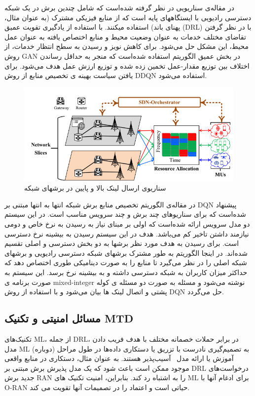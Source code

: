 در مقاله‌ی
 \cite{gan1, gan2}
سناریویی در نظر گرفته شده‌است که شامل چندین برش در یک شبکه دسترسی رادیویی با ایستگاههای پایه است که از منابع فیزیکی مشترک (به عنوان مثال، پهنای باند) استفاده میکنند. 
با استفاده از یادگیری تقویت عمیق (DRL) با در نظر گرفتن تقاضای مختلف خدمات به عنوان وضعیت محیط و منابع اختصاص یافته به عنوان عمل محیط، این مشکل حل می‌شود.
برای کاهش نویز و رسیدن به سطح انتظار خدمات، از روش GAN در بخش عمیق الگوریتم استفاده شده‌است که منجر به حداقل رساندن اختلاف بین توزیع مقدار-عمل تخمین زده شده و توزیع ارزش عمل هدف
می‌شود.
برای یافتن سیاست بهینه ی تخصیص منابع از روش
DDQN 
 استفاده می‌شود.
\begin{figure}
  \centering
    \includegraphics[scale=0.7]{./fig/gan}
  \caption{سناریوی ارسال لینک بالا و پایین در برشهای شبکه }
  \label{fig:gan}
\end{figure} 
 
در مقاله‌ی
\cite{li2020end} 
الگوریتم تخصیص منابع برش شبکه انتها به انتها مبتنی بر 
DQN 
 پیشنهاد شده‌است که برای سناریوهای چند برش و چند سرویس مناسب است.
 در این سیستم دو مدل سرویس ارائه شده‌است که اولی بر مبنای نیاز به رسیدن به نرخ خاص و دومی نیازمند داشتن تاخیر کم می‌باشد.
هدف در این سیستم رسیدن به بیشینه نرخ دسترسی است.
برای رسیدن به هدف مورد نظر برشها به دو بخش دسترسی و اصلی تقسیم شده‌اند.
 در اینجا الگوریتم به طور مشترک برشهای شبکه دسترسی رادیویی و برشهای شبکه اصلی را در نظر می‌گیرد تا منابع را به صورت دینامیکی طوری اختصاص دهد که 
 حداکثر میزان کاربران به شبکه دسترسی داشته و به بیشینه نرخ برسد.
 این سیستم به صورت برنامه ی
 mixed-integer
 نوشته می‌شود
و مسئله به صورت دو مسئله ی کوله پشتی و اتصال لینک ها بیان می‌شود
  و با استفاده از روش
 DQN
 حل می‌گردد.
 \subsection{مسائل امنیتی و تکنیک MTD}
تکنیک‌های ML، از جمله DRL، در برابر حملات خصمانه مختلف با هدف فریب دادن مدل ML به تصمیم‌گیری نادرست با تزریق یا دستکاری داده‌ها در طول مراحل (دوباره) آموزش یا ارائه مدل~\cite{aisecme} آسیب‌پذیر هستند.
به عنوان مثال، دستکاری در منابع واقعی موجود ممکن است باعث شود که یک مدل پذیرش برش مبتنی بر DRL درخواست‌های جدید برش RAN را به اشتباه رد کند. بنابراین، امنیت تکنیک های ML برای ادغام آنها با O-RAN حیاتی است و اعتماد را در تصمیمات آنها تقویت می کند.


